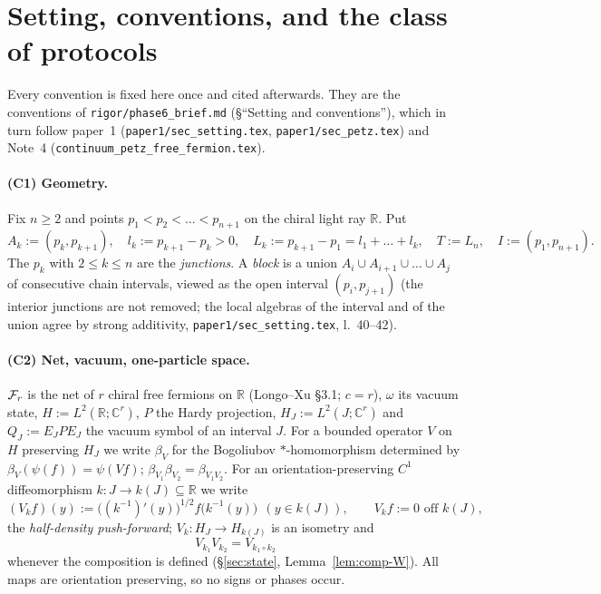 \documentclass[11pt]{article}
\newcommand{\Fr}{\cF_r}
\theoremstyle{definition}\newtheorem{example}[theorem]{Example}
\begin{document}
\tableofcontents

\section{Setting, conventions, and the class of protocols}\label{sec:setting}

Every convention is fixed here once and cited afterwards.  They are the conventions of
\texttt{rigor/phase6\_brief.md} (\S``Setting and conventions''), which in turn follow
paper~1 (\texttt{paper1/sec\_setting.tex}, \texttt{paper1/sec\_petz.tex}) and Note~4
(\texttt{continuum\_petz\_free\_fermion.tex}).

\paragraph{(C1) Geometry.}
Fix $n\ge2$ and points $p_1<p_2<\dots<p_{n+1}$ on the chiral light ray $\mathbb R$.  Put
\[
 A_k:=(p_k,p_{k+1}),\quad l_k:=p_{k+1}-p_k>0,\quad
 L_k:=p_{k+1}-p_1=l_1+\dots+l_k,\quad T:=L_n,\quad I:=(p_1,p_{n+1}).
\]
The $p_k$ with $2\le k\le n$ are the \emph{junctions}.  A \emph{block} is a union
$A_i\cup A_{i+1}\cup\dots\cup A_j$ of consecutive chain intervals, viewed as the open interval
$(p_i,p_{j+1})$ (the interior junctions are not removed; the local algebras of the interval and
of the union agree by strong additivity, \texttt{paper1/sec\_setting.tex}, l.~40--42).

\paragraph{(C2) Net, vacuum, one-particle space.}
$\Fr$ is the net of $r$ chiral free fermions on $\mathbb R$ (Longo--Xu \cite{LX} \S3.1; $c=r$),
$\omega$ its vacuum state, $H:=L^2(\mathbb R;\mathbb C^r)$, $P$ the Hardy projection,
$H_J:=L^2(J;\mathbb C^r)$ and $Q_J:=E_JPE_J$ the vacuum symbol of an interval $J$.  For a
bounded operator $V$ on $H$ preserving $H_J$ we write $\beta_V$ for the Bogoliubov
$*$-homomorphism determined by $\beta_V(\psi(f))=\psi(Vf)$; $\beta_{V_1}\beta_{V_2}=\beta_{V_1V_2}$.
For an orientation-preserving $C^1$ diffeomorphism $k:J\to k(J)\subseteq\mathbb R$ we write
\begin{equation}\label{eq:pushforward}
 (V_kf)(y):=\bigl((k^{-1})'(y)\bigr)^{1/2}f\bigl(k^{-1}(y)\bigr)\ \ (y\in k(J)),\qquad
 V_kf:=0 \text{ off } k(J),
\end{equation}
the \emph{half-density push-forward}; $V_k:H_J\to H_{k(J)}$ is an isometry and
\begin{equation}\label{eq:functorial}
 V_{k_1}V_{k_2}=V_{k_1\circ k_2}
\end{equation}
whenever the composition is defined (\S\ref{sec:state}, Lemma~\ref{lem:comp-W}).  All maps
are orientation preserving, so no signs or phases occur.
\end{document}
